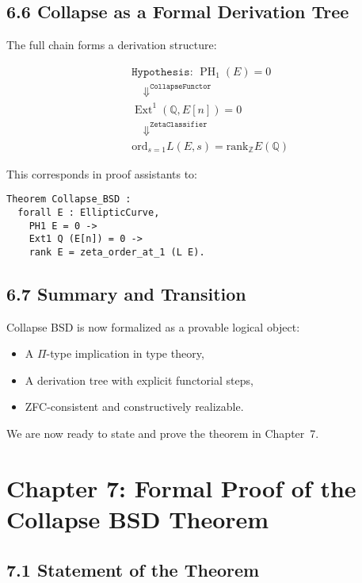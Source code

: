 \documentclass[11pt]{article}
\DeclareMathOperator{\Ext}{Ext}
\DeclareMathOperator{\PH}{PH}
\newcommand{\QQ}{\mathbb{Q}}
\newcommand{\ZZ}{\mathbb{Z}}
\begin{document}
\subsection{6.6 Collapse as a Formal Derivation Tree}

The full chain forms a derivation structure:

\[
\begin{aligned}
& \texttt{Hypothesis: } \PH_1(E) = 0 \\
& \quad \Downarrow^{\texttt{CollapseFunctor}} \\
& \Ext^1(\QQ,E[n]) = 0 \\
& \quad \Downarrow^{\texttt{ZetaClassifier}} \\
& \mathrm{ord}_{s=1} L(E,s) = \mathrm{rank}_{\ZZ} E(\QQ)
\end{aligned}
\]

This corresponds in proof assistants to:

\begin{lstlisting}
Theorem Collapse_BSD :
  forall E : EllipticCurve,
    PH1 E = 0 ->
    Ext1 Q (E[n]) = 0 ->
    rank E = zeta_order_at_1 (L E).
\end{lstlisting}

\subsection{6.7 Summary and Transition}

Collapse BSD is now formalized as a provable logical object:
\begin{itemize}
  \item A $\Pi$-type implication in type theory,
  \item A derivation tree with explicit functorial steps,
  \item ZFC-consistent and constructively realizable.
\end{itemize}
We are now ready to state and prove the theorem in Chapter~7.




\section{Chapter 7: Formal Proof of the Collapse BSD Theorem}

\subsection{7.1 Statement of the Theorem}
\end{document}
